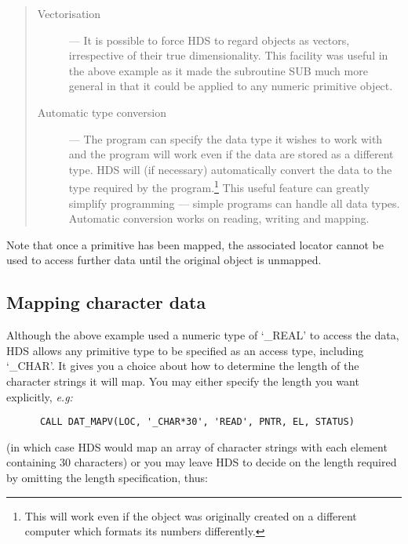 \begin{quote}
\begin{description}

\item [Vectorisation] ---
It is possible to force HDS to regard objects as vectors, irrespective of
their true dimensionality.
This facility was useful in the above example as it made the subroutine SUB
much more general in that it could be applied to any numeric primitive object.

\item [Automatic type conversion] ---
The program can specify the data type it wishes to work with and the program
will work even if the data are stored as a different type.
HDS will (if necessary) automatically convert the data to the type required by
the program.\footnote{This will work even if the object was originally created
on a different computer which formats its numbers differently.}
This useful feature can greatly simplify programming --- simple programs can
handle all data types.
Automatic conversion works on reading, writing and mapping.

\end{description}
\end{quote}

Note that once a primitive has been mapped, the associated locator cannot be
used to access further data until the original object is unmapped.

\subsection{Mapping character data}
\label{S_charmapping}

Although the above example used a numeric type of `\_REAL' to access the data,
HDS allows any primitive type to be specified as an access type, including
`\_CHAR'.
It gives you a choice about how to determine the length of the character
strings it will map.
You may either specify the length you want explicitly, {\em e.g:}

\begin{small}
\begin{verbatim}
      CALL DAT_MAPV(LOC, '_CHAR*30', 'READ', PNTR, EL, STATUS)
\end{verbatim}
\end{small}


(in which case HDS would map an array of character strings with each element
containing 30 characters) or you may leave HDS to decide on the length
required by omitting the length specification, thus:

